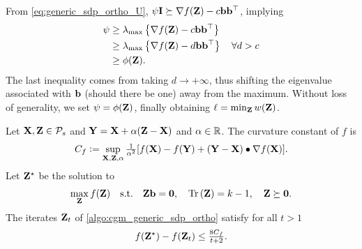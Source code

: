 \documentclass[twoside,11pt]{article}
\begin{document}
{	From \cref{eq:generic_sdp_ortho_U}, $\psi {\mathbf{I}} \succeq \nabla f({\mathbf{Z}}) - c {\mathbf{b}} {{\mathbf{b}}}^\top$, implying
	\begin{subequations}
		\begin{align}
			\psi
			&\geq \lambda_{\text{max}} \left\{ \nabla f({\mathbf{Z}}) - c {\mathbf{b}} {{\mathbf{b}}}^\top \right\} \\
			&\geq \lambda_{\text{max}} \left\{ \nabla f({\mathbf{Z}}) - d {\mathbf{b}} {{\mathbf{b}}}^\top \right\}
			\quad \forall d > c \\
			&\geq \phi({\mathbf{Z}}).
		\end{align}    
	\end{subequations}
	The last inequality comes from taking $d \rightarrow +\infty$, thus shifting the eigenvalue associated with ${\mathbf{b}}$ (should there be one) away from the maximum.
	Without loss of generality, we set $\psi = \phi({\mathbf{Z}})$, finally obtaining $\ell = \min_{{\mathbf{Z}}} w({\mathbf{Z}})$.
}

\begin{proposition}
	Let ${\mathbf{X}}, {\mathbf{Z}} \in {\mathcal{P}}_s$ and ${\mathbf{Y}} = {\mathbf{X}} + \alpha ({\mathbf{Z}} - {\mathbf{X}})$ and $\alpha \in {\mathbb R}$.
	The curvature constant of $f$ is
	\begin{equation}
	C_f \vcentcolon=
	\sup_{{\mathbf{X}}, {\mathbf{Z}}, \alpha}
	\tfrac{1}{\alpha^2}
	[ f({\mathbf{X}}) - f({\mathbf{Y}}) + ({\mathbf{Y}} - {\mathbf{X}}) \bullet \nabla f({\mathbf{X}}) ] .
	\end{equation}    
	Let ${\mathbf{Z}}^{\star}$ be the solution to 
	\begin{equation}
	\max_{{\mathbf{Z}}}
	f({\mathbf{Z}})
	\quad\text{s.t.}\quad
	{\mathbf{Z}} {\mathbf{b}} = {\mathbf{0}} ,
	\quad
	\operatorname{Tr}\left({\mathbf{Z}}\right) = k - 1 ,
	\quad
	{\mathbf{Z}} \succeq {\mathbf{0}} .
	\end{equation}
	The iterates ${\mathbf{Z}}_t$ of \cref{algo:cgm_generic_sdp_ortho} satisfy for all $t > 1$
	\begin{equation}
	f({\mathbf{Z}}^{\star}) - f({\mathbf{Z}}_t) \leq  \tfrac{8 C_f}{t+2} .
	\end{equation}
\end{proposition}
\end{document}
